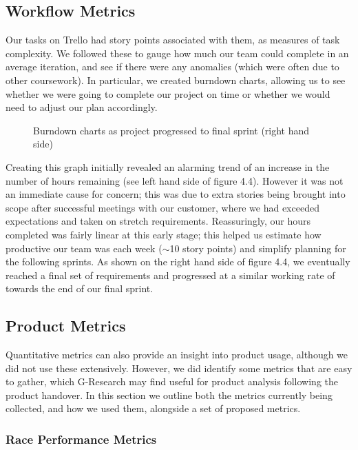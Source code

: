\subsection{Workflow Metrics}
Our tasks on Trello had story points associated with them, as measures of task complexity. We followed these to gauge how much our team could complete in an average iteration, and see if there were any anomalies (which were often due to other coursework). In particular, we created burndown charts, allowing us to see whether we were going to complete our project on time or whether we would need to adjust our plan accordingly. 

\begin{figure}[h]
\caption{Burndown charts as project progressed to final sprint (right hand side)}
\end{figure}

Creating this graph initially revealed an alarming trend of an increase in the number of hours remaining (see left hand side of figure 4.4). However it was not an immediate cause for concern; this was due to extra stories being brought into scope after successful meetings with our customer, where we had exceeded expectations and taken on stretch requirements. Reassuringly, our hours completed was fairly linear at this early stage; this helped us estimate how productive our team was each week ($\sim$10 story points) and simplify planning for the following sprints. As shown on the right hand side of figure 4.4, we eventually reached a final set of requirements and progressed at a similar working rate of towards the end of our final sprint. 

\subsection{Product Metrics}

Quantitative metrics can also provide an insight into product usage, although we did not use these extensively. However, we did identify some metrics that are easy to gather, which G-Research may find useful for product analysis following the product handover. In this section we outline both the metrics currently being collected, and how we used them, alongside a set of proposed metrics. 

\subsubsection{Race Performance Metrics}


